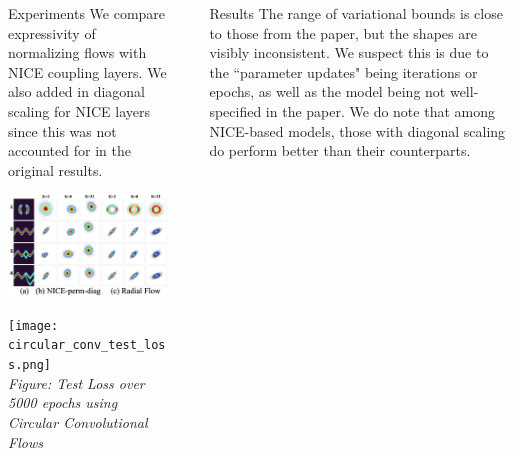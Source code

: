\documentclass[final,hyperref={pdfpagelabels=false}]{beamer}
\newcommand{\shrink}{-15pt}
\begin{document}
\begin{frame}[t]
\begin{columns}[t]
\begin{column}{.3\textwidth}
    
          
      \begin{block}{Experiments}
     	We compare expressivity of normalizing flows with NICE coupling layers. We also added in diagonal scaling for NICE layers since this was not accounted for in the original results.
      \end{block}
      
      \begin{center}
	\includegraphics[width=0.9\columnwidth]{EFs-ours}
      \end{center}
      
      	\begin{center}
        \texttt{[image: circular\_conv\_test\_loss.png]}\\
        \textit{Figure: Test Loss over 5000 epochs using Circular Convolutional Flows}
      \end{center}
      
      
    

  \end{column} %
  


  \begin{column}{.02\textwidth}\end{column} %

  \begin{column}{.3\textwidth} %

    \vspace{\shrink} 
   \begin{block}{Results}
      The range of variational bounds is close to those from the paper, but the shapes are visibly inconsistent. We suspect this is due to the ``parameter updates" being iterations or epochs, as well as the model being not well-specified in the paper. We do note that among NICE-based models, those with diagonal scaling do perform better than their counterparts.
      \end{block}
    

\end{column}
\end{columns}
\end{frame}
\end{document}
